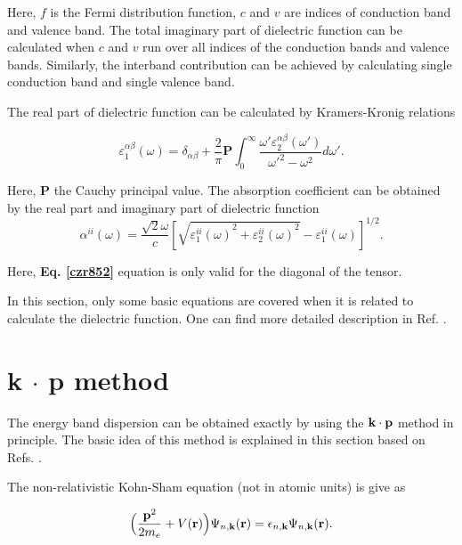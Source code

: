 \documentclass[a4paper, 12pt, titlepage,oneside,drop]{kthesis}
\begin{document}
Here, $f$ is the Fermi distribution function,  $c$ and $v$ are indices of conduction band and valence band. The total imaginary part of dielectric function can be calculated when $c$ and $v$ run over all indices of 
the conduction bands and valence bands. Similarly, the interband contribution can be achieved by calculating single conduction band and single valence band.   

The real part of dielectric function can be calculated by Kramers-Kronig relations

\begin{equation}
 \varepsilon_1^{\alpha\beta} (\omega)= \delta_{\alpha\beta}+\frac{2}{\pi}\textbf{P}\int^{\infty}_{0} \frac{\omega'\varepsilon_2^{\alpha\beta}(\omega')}{\omega'^{2}-\omega^{2}} d\omega'.
\end{equation}

Here, $\textbf{P}$ the Cauchy principal value. The absorption coefficient can be obtained by the real part and imaginary part of dielectric function
\begin{equation}\label{czr852}
 \alpha^{ii}(\omega) = \frac{\sqrt{2}\omega}{c} \left[ \sqrt{{\varepsilon^{ii}_1(\omega)}^2+{\varepsilon^{ii}_2(\omega)}^2}-{\varepsilon^{ii}_1(\omega)} \right]^{1/2}.
\end{equation}

Here, \textbf{Eq. \ref{czr852}} equation is only valid for the diagonal of the tensor.

In this section, only some basic equations are covered when it is related to calculate the dielectric function. One can find more detailed description in Ref. \cite{ambrosch2006linear}.


\section{\textbf{k} $\cdot$ \textbf{p} method}
\label{kpmaa}

The energy band dispersion can be obtained exactly by using the $\bold k \cdot \bold p$ method in principle. The basic idea of this method is explained in this section based on Refs. \cite{voon2009kp, kane1966k}.

The non-relativistic Kohn-Sham equation (not in atomic units) is give as

\begin{equation}\label{kpse}
\Big( \frac {{\textbf p}^2} {2m_e} + V({\textbf r}) \Big) \wfbloch<n>< \bold k> = \epsilon_{n,\textbf{k}} \wfbloch<n><\bold k>.
\end{equation}
\end{document}
